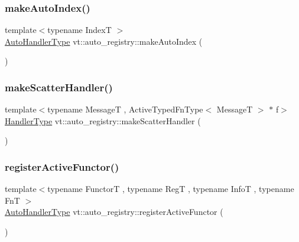 \subsubsection{\texorpdfstring{make\+Auto\+Index()}{makeAutoIndex()}}
{\footnotesize\ttfamily template$<$typename IndexT $>$ \\
\hyperlink{namespacevt_1_1auto__registry_ae295e18699146815bb7d7674594d95d7}{Auto\+Handler\+Type} vt\+::auto\+\_\+registry\+::make\+Auto\+Index (\begin{DoxyParamCaption}{ }\end{DoxyParamCaption})\hspace{0.3cm}{\ttfamily [inline]}}

\mbox{\label{namespacevt_1_1auto__registry_a4fa21479ba39b8c493729b941f9f267b}} 
\subsubsection{\texorpdfstring{make\+Scatter\+Handler()}{makeScatterHandler()}}
{\footnotesize\ttfamily template$<$typename MessageT , Active\+Typed\+Fn\+Type$<$ Message\+T $>$ $\ast$ f$>$ \\
\hyperlink{namespacevt_af64846b57dfcaf104da3ef6967917573}{Handler\+Type} vt\+::auto\+\_\+registry\+::make\+Scatter\+Handler (\begin{DoxyParamCaption}{ }\end{DoxyParamCaption})\hspace{0.3cm}{\ttfamily [inline]}}

\mbox{\label{namespacevt_1_1auto__registry_ab7e130e8790e4df4dc1d35476d1736e0}} 
\subsubsection{\texorpdfstring{register\+Active\+Functor()}{registerActiveFunctor()}}
{\footnotesize\ttfamily template$<$typename FunctorT , typename RegT , typename InfoT , typename FnT $>$ \\
\hyperlink{namespacevt_1_1auto__registry_ae295e18699146815bb7d7674594d95d7}{Auto\+Handler\+Type} vt\+::auto\+\_\+registry\+::register\+Active\+Functor (\begin{DoxyParamCaption}{ }\end{DoxyParamCaption})}

